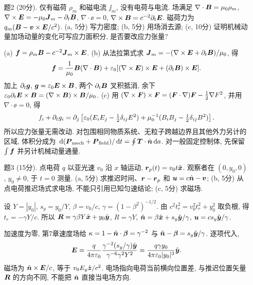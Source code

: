 \begin{exercise}
题2 (20分). 仅有磁荷 $\rho_m$ 和磁电流 $\jj_m$, 没有电荷与电流. 场满足 $\nabla\cdot\boldsymbol{B}=\mu_0\rho_m$, $\nabla\times\boldsymbol{E}=-\mu_0\boldsymbol{J}_m-\partial_t\boldsymbol{B}$, $\nabla\cdot\ee=0$, $\nabla\times\boldsymbol{B}=c^{-2}\partial_t\boldsymbol{E}$. 磁荷力为 $q_m(\boldsymbol{B}-\boldsymbol{v}\times\boldsymbol{E}/c^2)$. (a, 5分) 写力密度; (b, 5分) 用场消去源; (c, 10分) 证明机械动量加场动量的变化可写应力面积分, 是否要改应力张量?
\end{exercise}
\begin{solution}
(a) $\boldsymbol{f}=\rho_m\boldsymbol{B}-c^{-2}\boldsymbol{J}_m\times\boldsymbol{E}$. (b) 从法拉第式求 $\boldsymbol{J}_m=-(\nabla\times\boldsymbol{E}+\partial_t\boldsymbol{B})/\mu_0$, 得
\[
\boldsymbol{f}=\frac1{\mu_0}\boldsymbol{B}(\nabla\cdot\boldsymbol{B})
+\varepsilon_0[(\nabla\times\boldsymbol{E})\times\boldsymbol{E}+(\partial_t\boldsymbol{B})\times\boldsymbol{E}].
\]
加上 $\partial_t\boldsymbol{g}$, $\boldsymbol{g}=\varepsilon_0\boldsymbol{E}\times\boldsymbol{B}$, 两个 $\partial_t\boldsymbol{B}$ 叉积抵消, 余下 $\varepsilon_0\partial_t\boldsymbol{E}\times\boldsymbol{B}=(\nabla\times\boldsymbol{B})\times\boldsymbol{B}/\mu_0$.
(c) 用 $(\nabla\times\boldsymbol{F})\times\boldsymbol{F}=(\boldsymbol{F}\cdot\nabla)\boldsymbol{F}-\frac12\nabla F^2$, 并用 $\nabla\cdot\ee=0$, 得
\[
f_i+\partial_tg_i=\partial_j\left[\varepsilon_0(E_iE_j-\tfrac12\delta_{ij}E^2)
+\mu_0^{-1}(B_iB_j-\tfrac12\delta_{ij}B^2)\right].
\]
所以应力张量无需改动. 对包围相同物质系统、无粒子跨越边界且其他外力另计的区域, 体积分成为 $\,\mathrm d(\boldsymbol{P}_\mathrm{mech}+\boldsymbol{P}_\mathrm{field})/\,\mathrm d t=\oint\boldsymbol{T}\cdot\hat{\boldsymbol{n}}\,\mathrm d a$. 对一般固定控制体, 先保留 $\int\boldsymbol{f}$ 并另计机械动量通量.
\end{solution}

\begin{exercise}
题3 (15分). 点电荷 $q$ 以亚光速 $v_0$ 沿 $x$ 轴运动, $\boldsymbol{r}_p(t)=v_0t\hat{\boldsymbol{x}}$. 观察者在 $(0,y_0,0)$, $y_0\ne0$, 于 $t=0$ 测量. (a, 5分) 求推迟时间、$\boldsymbol{r}-\boldsymbol{r}_p$ 和 $\boldsymbol{u}=c\hat{\boldsymbol{n}}-\boldsymbol{v}$; (b, 5分) 从点电荷推迟场式求电场, 不能只引用已知匀速结论; (c, 5分) 求磁场.
\end{exercise}
\begin{solution}
设 $Y=|y_0|$, $s_y=y_0/Y$, $\beta=v_0/c$, $\gamma=(1-\beta^2)^{-1/2}$. 由 $c^2t_r^2=v_0^2t_r^2+y_0^2$ 取负根, 得 $t_r=-\gamma Y/c$. 所以 $\boldsymbol{R}=\gamma\beta Y\hat{\boldsymbol{x}}+y_0\hat{\boldsymbol{y}}$, $R=\gamma Y$, $\hat{\boldsymbol{n}}=\beta\hat{\boldsymbol{x}}+s_y\hat{\boldsymbol{y}}/\gamma$, $\boldsymbol{u}=cs_y\hat{\boldsymbol{y}}/\gamma$.

加速度为零, 第7章速度场给 $\kappa=1-\hat{\boldsymbol{n}}\cdot\boldsymbol{\beta}=\gamma^{-2}$ 与 $\hat{\boldsymbol{n}}-\boldsymbol{\beta}=s_y\hat{\boldsymbol{y}}/\gamma$. 逐项代入,
\[
\boldsymbol{E}=\frac q{4\pi\varepsilon_0}\frac{\gamma^{-2}(s_y/\gamma)\hat{\boldsymbol{y}}}
{\gamma^{-6}\gamma^2Y^2}
=\frac{q\gamma y_0}{4\pi\varepsilon_0|y_0|^3}\hat{\boldsymbol{y}}.
\]
磁场为 $\hat{\boldsymbol{n}}\times\boldsymbol{E}/c$, 等于 $v_0E_y\hat{\boldsymbol{z}}/c^2$. 电场指向电荷当前横向位置差, 与推迟位置矢量 $\boldsymbol{R}$ 的方向不同, 不能把 $\hat{\boldsymbol{n}}$ 直接当电场方向.
\end{solution}

